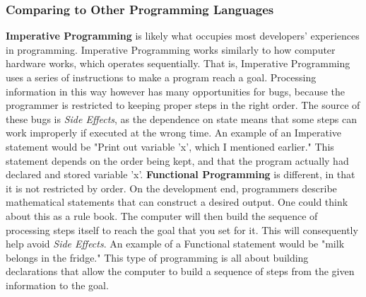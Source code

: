 \documentclass{article}
\begin{document}
        \subsubsection{Comparing to Other Programming Languages}
        \textbf{Imperative Programming} is likely what occupies most developers' experiences in programming. Imperative Programming works similarly to how computer hardware works, which operates sequentially. That is, Imperative Programming uses a series of instructions to make a program reach a goal. Processing information in this way however has many opportunities for bugs, because the programmer is restricted to keeping proper steps in the right order. The source of these bugs is \textit{Side Effects}, as the dependence on state means that some steps can work improperly if executed at the wrong time. An example of an Imperative statement would be "Print out variable 'x', which I mentioned earlier." This statement depends on the order being kept, and that the program actually had declared and stored variable 'x'.
        \medskip
        \textbf{Functional Programming} is different, in that it is not restricted by order. On the development end, programmers describe mathematical statements that can construct a desired output. One could think about this as a rule book. The computer will then build the sequence of processing steps itself to reach the goal that you set for it. This will consequently help avoid \textit{Side Effects}. An example of a Functional statement would be "milk belongs in the fridge." This type of programming is all about building declarations that allow the computer to build a sequence of steps from the given information to the goal.
        \bigskip
        
\end{document}
